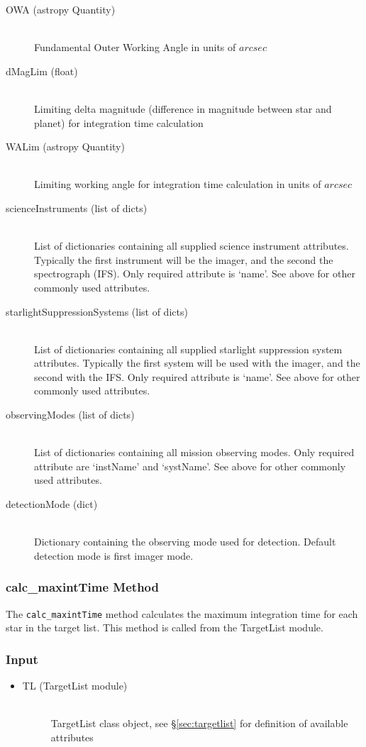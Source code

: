 \documentclass[cleanfoot]{asme2ej}
\begin{document}
\begin{itemize}
\begin{description}
    \item[OWA (astropy Quantity)] \hfill \\ Fundamental Outer Working Angle in units of $ arcsec $
    \item[dMagLim (float)] \hfill \\ Limiting delta magnitude (difference in magnitude between star and planet) for integration time calculation
    \item[WALim (astropy Quantity)] \hfill \\ Limiting working angle for integration time calculation in units of $ arcsec $
    \item[scienceInstruments (list of dicts)] \hfill \\  List of dictionaries containing all supplied science instrument attributes.  Typically the first instrument will be the imager, and the second the spectrograph (IFS). Only required attribute is `name'.  See above for other commonly used attributes. 
    \item[starlightSuppressionSystems (list of dicts)] \hfill \\  List of dictionaries containing all supplied starlight suppression system attributes. Typically the first system will be used with the imager, and the second with the IFS. Only required attribute is `name'. See above for other commonly used attributes.
    \item[observingModes (list of dicts)] \hfill \\  List of dictionaries containing all mission observing modes. Only required attribute are `instName' and `systName'. See above for other commonly used attributes.    
    \item[detectionMode (dict)] \hfill \\  Dictionary containing the observing mode used for detection. Default detection mode is first imager mode.
\end{description}
\end{itemize}

\subsubsection{calc\_maxintTime Method} \label{sec:calcmaxintTimetask}
The \verb+calc_maxintTime+ method calculates the maximum integration time for each star in the target list.  This method is called from the TargetList module.

\subsubsection*{Input}
\begin{itemize}
\item 
\begin{description}
    \item[TL (TargetList module)] \hfill \\ TargetList class object, see \S\ref{sec:targetlist} for definition of available attributes
\end{description}
\end{itemize}
\end{document}

